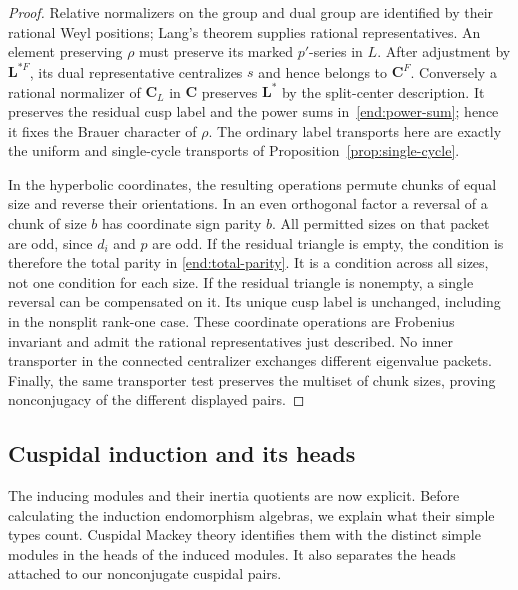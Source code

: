 \begin{proof}
Relative normalizers on the group and dual group are identified by
their rational Weyl positions; Lang's theorem supplies rational
representatives.  An element preserving $\rho$ must preserve its
marked $p'$-series in $L$.  After adjustment by $\mathbf L^{*F}$,
its dual representative centralizes $s$ and hence belongs to
$\mathbf C^F$.  Conversely a rational normalizer of $\mathbf C_L$
in $\mathbf C$ preserves $\mathbf L^*$ by the split-center
description.  It preserves the residual cusp label and the power
sums in~\eqref{end:power-sum}; hence it fixes the Brauer character
of $\rho$.  The ordinary label transports here are exactly the
uniform and single-cycle transports of
Proposition~\ref{prop:single-cycle}.

In the hyperbolic coordinates, the resulting operations permute
chunks of equal size and reverse their orientations.  In an even
orthogonal factor a reversal of a chunk of size $b$ has coordinate
sign parity $b$.  All permitted sizes on that packet are odd,
since $d_i$ and $p$ are odd.  If the residual triangle is empty,
the condition is therefore the total parity in
\eqref{end:total-parity}.  It is a condition across all sizes, not
one condition for each size.  If the residual triangle is nonempty,
a single reversal can be compensated on it.  Its unique cusp label
is unchanged, including in the nonsplit rank-one case.  These
coordinate operations are Frobenius invariant and admit the
rational representatives just described.  No inner transporter in
the connected centralizer exchanges different eigenvalue packets.
Finally, the same transporter test preserves the multiset of chunk
sizes, proving nonconjugacy of the different displayed pairs.
\end{proof}

\subsection{Cuspidal induction and its heads}

The inducing modules and their inertia quotients are now explicit.
Before calculating the induction endomorphism algebras, we explain
what their simple types count.  Cuspidal Mackey theory identifies
them with the distinct simple modules in the heads of the induced
modules.  It also separates the heads attached to our nonconjugate
cuspidal pairs.

